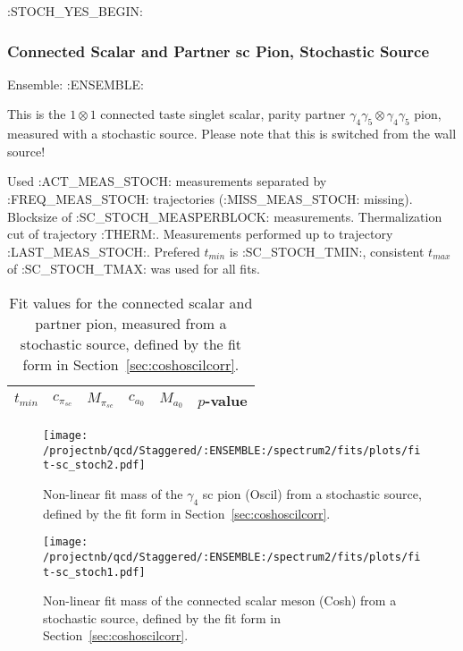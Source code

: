 \clearpage

:STOCH_YES_BEGIN:
\subsubsection{Connected Scalar and Partner sc Pion, Stochastic Source}

Ensemble: :ENSEMBLE:

This is the $1 \otimes 1$ connected taste singlet scalar, parity partner $\gamma_4 \gamma_5 \otimes \gamma_4 \gamma_5$ pion, measured with a stochastic source. Please note that this is switched from the wall source!

{\small{Used :ACT_MEAS_STOCH: measurements separated by :FREQ_MEAS_STOCH: trajectories (:MISS_MEAS_STOCH: missing). Blocksize of :SC_STOCH_MEASPERBLOCK: measurements. Thermalization cut of trajectory :THERM:. Measurements performed up to trajectory :LAST_MEAS_STOCH:. Prefered $t_{min}$ is :SC_STOCH_TMIN:, consistent $t_{max}$ of :SC_STOCH_TMAX: was used for all fits.}}

\begin{table}[ht!]
\centering
\scriptsize
\begin{tabular}{|c|c|c|c|c|c|}
\hline
 $t_{min}$ & $c_{\pi_{sc}}$ &  $M_{\pi_{sc}}$ & $c_{a_0}$ & $M_{a_0}$ & $p$-value \\
\hline

\end{tabular}
\caption{Fit values for the connected scalar and partner pion, measured from a stochastic source, defined by the fit form in Section~\ref{sec:coshoscilcorr}.}
\end{table}


\begin{multicols}{2}
\begin{figure}[H]
\centering
\texttt{[image: /projectnb/qcd/Staggered/:ENSEMBLE:/spectrum2/fits/plots/fit-sc\_stoch2.pdf]}
\caption{Non-linear fit mass of the $\gamma_4$ sc pion (Oscil) from a stochastic source, defined by the fit form in Section~\ref{sec:coshoscilcorr}.}
\end{figure}
\columnbreak
\begin{figure}[H]
\centering
\texttt{[image: /projectnb/qcd/Staggered/:ENSEMBLE:/spectrum2/fits/plots/fit-sc\_stoch1.pdf]}
\caption{Non-linear fit mass of the connected scalar meson (Cosh) from a stochastic source, defined by the fit form in Section~\ref{sec:coshoscilcorr}.}
\end{figure}
\end{multicols}

